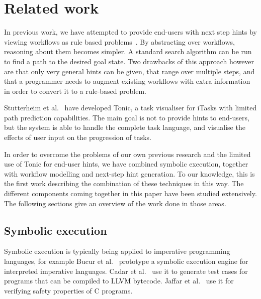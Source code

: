 
\section{Related work}
\label{sec:relatedwork}

In previous work, we have attempted to provide end-users with next step hints by viewing workflows as rule based problems~\cite{DBLP:conf/sfp/NausJ16}.
By abstracting over workflows, reasoning about them becomes simpler.
A standard search algorithm can be run to find a path to the desired goal state.
Two drawbacks of this approach however are that only very general hints can be given, that range over multiple steps, and that a programmer needs to augment existing workflows with extra information in order to convert it to a rule-based problem.

Stutterheim et al.~\cite{DBLP:conf/sfp/StutterheimPA14} have developed Tonic, a task visualiser for iTasks with limited path prediction capabilities.
The main goal is not to provide hints to end-users, but the system is able to handle the complete task language, and visualise the effects of user input on the progression of tasks.

In order to overcome the problems of our own previous research and the limited use of Tonic for end-user hints, we have combined symbolic execution, together with workflow modelling and next-step hint generation.
To our knowledge, this is the first work describing the combination of these techniques in this way.
The different components coming together in this paper have been studied extensively.
The following sections give an overview of the work done in those areas.

\subsection{Symbolic execution}


Symbolic execution \cite{King1975,Boyer1975} is typically being applied to imperative programming languages, for example Bucur et al.~\cite{BucurKC2014} prototype a symbolic execution engine for interpreted imperative languages.
Cadar et al.~\cite{CadarDE2008} use it to generate test cases for programs that can be compiled to LLVM bytecode.
Jaffar et al.~\cite{JaffarMNS2012} use it for verifying safety properties of C programs.


